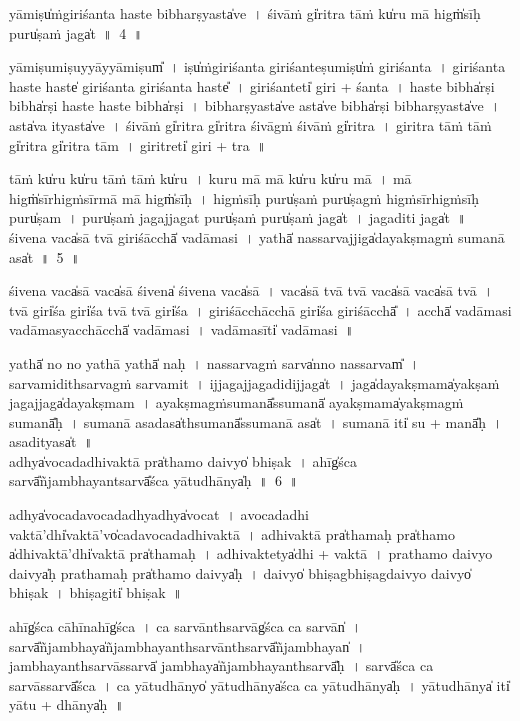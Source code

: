 \documentclass[parskip, DIV=14]{scrartcl}
\begin{document}
{\vspace{0.5cm}
yāmiṣu̍ṁgiriśanta॒ haste॒ bibha॒rṣyasta̍ve~।
śi॒vāṁ gi̍ritra॒ tāṁ ku̍ru॒ mā higṁ̍sī॒ḥ puru̍ṣa॒ṁ jaga̍t~॥~4~॥

yāmiṣu॒miṣu॒yyāyyāmiṣum̎~। iṣu̍ṁgiriśanta giriśa॒nteṣu॒miṣu̍ṁ giriśanta~।
gi॒ri॒śa॒nta॒ haste॒ haste̍ giriśanta giriśanta॒ haste̎~।
gi॒ri॒śa॒nteti̍ giri + śa॒nta॒~।
haste॒ bibha̍rṣi॒ bibha̍rṣi॒ haste॒ haste॒ bibha̍rṣi~।
bibha॒rṣyasta̍ve॒ asta̍ve॒ bibha̍rṣi॒ bibha॒rṣyasta̍ve~।
asta̍va॒  ityasta̍ve~।
śi॒vāṁ gi̍ritra gi̍ritra śi॒vāgṁ śi॒vāṁ gi̍ritra~।
gi॒ri॒tra॒ tāṁ tāṁ gi̍ritra gi̍ritra॒ tām~।
gi॒ri॒treti̍ giri + tra॒~॥

tāṁ ku̍ru ku̍ru॒ tāṁ tāṁ ku̍ru~।
ku॒ru॒ mā mā ku̍ru ku̍ru॒ mā~।
mā higṁ̍sīrhigṁsī॒rmā mā higṁ̍sīḥ~।
hi॒gṁ॒sī॒ḥ puru̍ṣa॒ṁ puru̍ṣagṁ higṁsī॒rhigṁsī॒ḥ puru̍ṣam~।
puru̍ṣa॒ṁ jaga॒jjaga॒t puru̍ṣa॒ṁ puru̍ṣa॒ṁ jaga̍t~।
jaga॒diti॒ jaga̍t~॥\\ 

\vspace{0.5cm}
śi॒vena॒ vaca̍sā tvā॒ giri॒śācchā̍ vadāmasi~।
yathā̍ na॒ssarva॒jjiga̍daya॒kṣmagṁ su॒manā॒ asa̍t~॥~5~॥

śi॒vena॒ vaca̍sā॒ vaca̍sā śi॒vena̍ śi॒vena॒ vaca̍sā~।
vaca̍sā tvā tvā॒ vaca̍sā॒ vaca̍sā tvā~।
tvā॒ giri̍śa॒ giri̍śa tvā tvā॒ giri̍śa~।
gi॒ri॒śācchācchā॒ giri̍śa॒ giri॒śācchā̎~।
acchā̍ vadāmasi vadāma॒syacchācchā̍ vadāmasi~।
va॒dā॒ma॒sīti̍  vadāmasi~॥

yathā̍ no no॒ yathā॒ yathā̍ naḥ~।
na॒ssarva॒gṁ॒ sarva̍nno na॒ssarvam̎~।
sarva॒midithsarva॒gṁ॒ sarva॒mit~।
ijjaga॒jjaga॒didijjaga̍t~।
jaga̍daya॒kṣmama̍ya॒kṣaṁ jaga॒jjaga̍daya॒kṣmam~।
a॒ya॒kṣmagṁsu॒manā̎ssu॒manā̍ aya॒kṣmama̍ya॒kṣmagṁ su॒manā̎ḥ~।
su॒manā॒ asa॒dasa̍thsu॒manā̎ssu॒manā॒ asa̍t~।
su॒manā॒ iti̍ su + manā̎ḥ~।
asa॒dityasa̍t~॥\\ 

\vspace{0.5cm}
adhya̍vocadadhiva॒ktā pra̍tha॒mo daivyo̍ bhi॒ṣak~।
ahīg̍śca॒ sarvā̎ñja॒mbhaya॒ntsarvā̎śca yātudhā॒nya̍ḥ~॥~6~॥

\vspace{0.5cm}
adhya̍vocadavoca॒dadhyadhya̍vocat~।
a॒vo॒ca॒da॒dhi॒ va॒ktā'dhi̍va॒ktā'vo̍cadavocadadhiva॒ktā~।
a॒dhi॒va॒ktā pra̍tha॒maḥ pra̍tha॒mo a̍dhiva॒ktā'dhi̍va॒ktā pra̍tha॒maḥ~।
a॒dhi॒va॒ktetya̍dhi + va॒ktā~।
pra॒tha॒mo daivyo॒ daivya̍ḥ pratha॒maḥ pra̍tha॒mo daivya̍ḥ~।
daivyo̍ bhi॒ṣagbhi॒ṣagdaivyo॒ daivyo̍ bhi॒ṣak~।
bhi॒ṣagiti̍  bhi॒ṣak~॥

ahīg̍śca॒ cāhī॒nahīg̍śca~।
ca॒ sarvā॒nthsarvāg̍śca ca॒ sarvān̍~।
sarvā̎ñja॒mbhaya̍ñja॒mbhaya॒nthsarvā॒nthsarvā̎ñja॒mbhayan̍~।
ja॒mbhaya॒nthsarvā॒ssarvā̍ ja॒mbhaya̍ñja॒mbhaya॒nthsarvā̎ḥ~।
sarvā̎śca ca॒ sarvā॒ssarvā̎śca~।
ca॒ yā॒tu॒dhā॒nyo̍ yātudhā॒nya̍śca ca yātudhā॒nya̍ḥ~।
yā॒tu॒dhā॒nya̍ iti̍ yātu + dhā॒nya̍ḥ~॥\\


}
\end{document}
